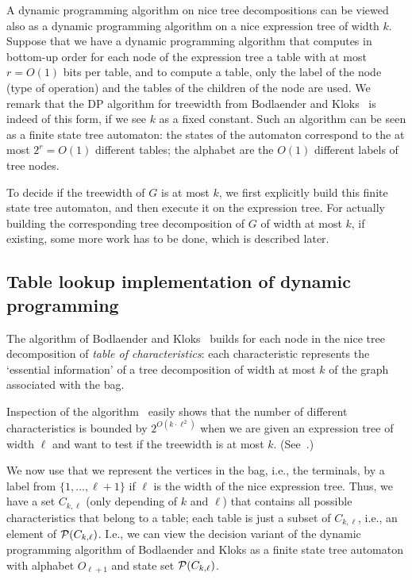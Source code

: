 \documentclass[a4paper,11pt]{article}
\theoremstyle{definition}
\theoremstyle{remark}
\begin{document}
A dynamic programming algorithm on nice tree decompositions can be
viewed also as a dynamic programming algorithm on a nice expression
tree of width $k$.  Suppose that we have a dynamic programming
algorithm that computes in bottom-up order for each node of the
expression tree a table with at most $r=O(1)$ bits per table, and to
compute a table, only the label of the node (type of operation) and
the tables of the children of the node are used.  We remark that the
DP algorithm for treewidth from Bodlaender and
Kloks~\cite{BodlaenderK96} is indeed of this form, if we see $k$ as a
fixed constant.  Such an algorithm can be seen as a finite state tree
automaton: the states of the automaton correspond to the at most $2^r
= O(1)$ different tables; the alphabet are the $O(1)$ different labels
of tree nodes.

To decide if the treewidth of $G$ is at most $k$, we first explicitly
build this finite state tree automaton, and then execute it on the
expression tree.  For actually building the corresponding tree
decomposition of $G$ of width at most $k$, if existing, some more work
has to be done, which is described later.

\subsection{Table lookup implementation of dynamic programming}
The algorithm of Bodlaender and Kloks~\cite{BodlaenderK96} builds for
each node in the nice tree decomposition of {\em table of
  characteristics}: each characteristic represents the `essential
information' of a tree decomposition of width at most $k$ of the graph
associated with the bag.

Inspection of the algorithm~\cite{BodlaenderK96} easily shows that the
number of different characteristics is bounded by $2^{O(k \cdot
  \ell^2)}$ when we are given an expression tree of width $\ell$ and
want to test if the treewidth is at most $k$.  (See~\cite[Definition
5.9]{BodlaenderK96}.)

We now use that we represent the vertices in the bag, i.e., the
terminals, by a label from $\{1, \ldots, \ell+1\}$ if $\ell$ is the
width of the nice expression tree.  Thus, we have a set $C_{k,\ell}$
(only depending of $k$ and $\ell$) that contains all possible
characteristics that belong to a table; each table is just a subset of
$C_{k,\ell}$, i.e., an element of ${\cal P}(C_{k,\ell})$.  I.e., we
can view the decision variant of the dynamic programming algorithm of
Bodlaender and Kloks as a finite state tree automaton with alphabet
$O_{\ell+1}$ and state set ${\cal P}(C_{k,\ell})$.
\end{document}
